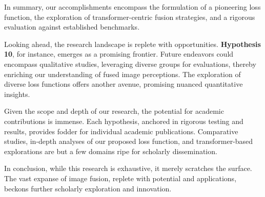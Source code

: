 In summary, our accomplishments encompass the formulation of a pioneering loss function, the exploration of transformer-centric fusion strategies, and a rigorous evaluation against established benchmarks.

Looking ahead, the research landscape is replete with opportunities. \textbf{Hypothesis 10}, for instance, emerges as a promising frontier. Future endeavors could encompass qualitative studies, leveraging diverse groups for evaluations, thereby enriching our understanding of fused image perceptions. The exploration of diverse loss functions offers another avenue, promising nuanced quantitative insights.

Given the scope and depth of our research, the potential for academic contributions is immense. Each hypothesis, anchored in rigorous testing and results, provides fodder for individual academic publications. Comparative studies, in-depth analyses of our proposed loss function, and transformer-based explorations are but a few domains ripe for scholarly dissemination.

In conclusion, while this research is exhaustive, it merely scratches the surface. The vast expanse of image fusion, replete with potential and applications, beckons further scholarly exploration and innovation.